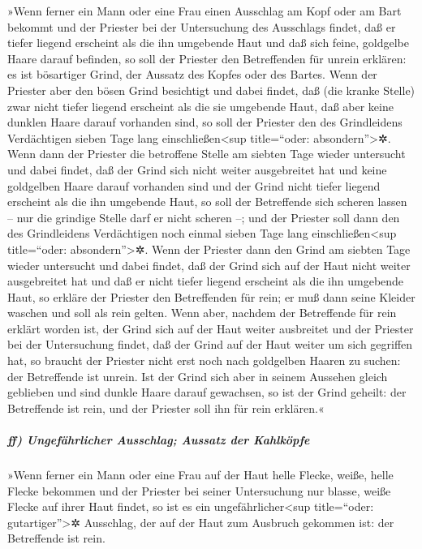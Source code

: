 »Wenn ferner ein Mann oder eine Frau einen Ausschlag am
Kopf oder am Bart bekommt und der Priester bei der
Untersuchung des Ausschlags findet, daß er tiefer liegend erscheint als
die ihn umgebende Haut und daß sich feine, goldgelbe Haare darauf
befinden, so soll der Priester den Betreffenden für unrein erklären: es
ist bösartiger Grind, der Aussatz des Kopfes oder des Bartes.
Wenn der Priester aber den bösen Grind besichtigt und
dabei findet, daß (die kranke Stelle) zwar nicht tiefer liegend
erscheint als die sie umgebende Haut, daß aber keine dunklen Haare
darauf vorhanden sind, so soll der Priester den des Grindleidens
Verdächtigen sieben Tage lang einschließen\textless sup title=``oder:
absondern''\textgreater✲. Wenn dann der Priester die
betroffene Stelle am siebten Tage wieder untersucht und dabei findet,
daß der Grind sich nicht weiter ausgebreitet hat und keine goldgelben
Haare darauf vorhanden sind und der Grind nicht tiefer liegend erscheint
als die ihn umgebende Haut, so soll der Betreffende sich
scheren lassen -- nur die grindige Stelle darf er nicht scheren --; und
der Priester soll dann den des Grindleidens Verdächtigen noch einmal
sieben Tage lang einschließen\textless sup title=``oder:
absondern''\textgreater✲. Wenn der Priester dann den
Grind am siebten Tage wieder untersucht und dabei findet, daß der Grind
sich auf der Haut nicht weiter ausgebreitet hat und daß er nicht tiefer
liegend erscheint als die ihn umgebende Haut, so erkläre der Priester
den Betreffenden für rein; er muß dann seine Kleider waschen und soll
als rein gelten. Wenn aber, nachdem der Betreffende für
rein erklärt worden ist, der Grind sich auf der Haut weiter ausbreitet
und der Priester bei der Untersuchung findet, daß der
Grind auf der Haut weiter um sich gegriffen hat, so braucht der Priester
nicht erst noch nach goldgelben Haaren zu suchen: der Betreffende ist
unrein. Ist der Grind sich aber in seinem Aussehen gleich
geblieben und sind dunkle Haare darauf gewachsen, so ist der Grind
geheilt: der Betreffende ist rein, und der Priester soll ihn für rein
erklären.«

\hypertarget{ff-ungefuxe4hrlicher-ausschlag-aussatz-der-kahlkuxf6pfe}{%
\subparagraph{ff) Ungefährlicher Ausschlag; Aussatz der
Kahlköpfe}\label{ff-ungefuxe4hrlicher-ausschlag-aussatz-der-kahlkuxf6pfe}}

»Wenn ferner ein Mann oder eine Frau auf der Haut helle
Flecke, weiße, helle Flecke bekommen und der Priester bei
seiner Untersuchung nur blasse, weiße Flecke auf ihrer Haut findet, so
ist es ein ungefährlicher\textless sup title=``oder:
gutartiger''\textgreater✲ Ausschlag, der auf der Haut zum Ausbruch
gekommen ist: der Betreffende ist rein.

